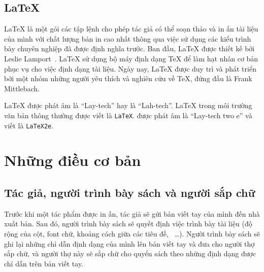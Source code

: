 \subsection{\LaTeX} \LaTeX{} là một gói các tập lệnh cho phép tác giả
có thể soạn thảo và in ấn tài liệu của mình với chất lượng bản in cao
nhất thông qua việc sử dụng các kiểu trình bày chuyên nghiệp đã được
định nghĩa trước. Ban đầu, \LaTeX{} được thiết kế bởi  Leslie Lamport~\cite{manual}. \LaTeX{} sử dụng bộ máy định
dạng \TeX{} để làm hạt nhân cơ bản phục vụ cho việc định dạng tài
liệu. Ngày nay, \LaTeX{} được duy trì và phát triển bởi một nhóm những
người yêu thích và nghiên cứu về \TeX{}, đứng đầu là
 Frank Mittlebach.


\LaTeX{} được phát âm là ``Lay-tech'' hay là ``Lah-tech''.
\LaTeX{} trong môi trường văn bản thông thường được viết là
\texttt{LaTeX}. \LaTeXe{} được phát âm là ``Lay-tech two e'' và
viết là \texttt{LaTeX2e}.



\section{Những điều cơ bản}
\subsection{Tác giả, người trình bày sách và người sắp chữ} Trước
khi một tác phẩm được in ấn, tác giả sẽ gửi bản viết tay của mình
đến nhà xuất bản. Sau đó, người trình bày sách sẽ quyết định việc
trình bày tài liệu (độ rộng của cột, font chữ, khoảng cách giữa
các tiêu đề, ~\ldots). Người trình bày sách sẽ ghi lại những chỉ
dẫn định dạng của mình lên bản viết tay và đưa cho người thợ sắp
chữ, và người thợ này sẽ sắp chữ cho quyển sách theo những định
dạng được chỉ dẫn trên bản viết tay.


